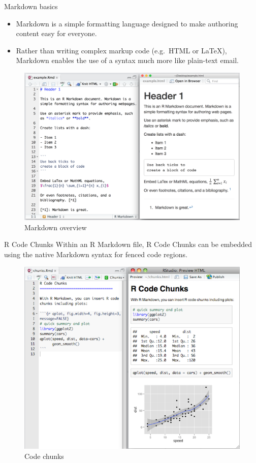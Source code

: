 \documentclass[
  ignorenonframetext,
]{beamer}
\begin{document}
\begin{frame}{Markdown basics}
\protect\hypertarget{markdown-basics}{}
\begin{itemize}
\item
  Markdown is a simple formatting language designed to make authoring
  content easy for everyone.
\item
  Rather than writing complex markup code (e.g.~HTML or LaTeX), Markdown
  enables the use of a syntax much more like plain-text email.
\end{itemize}

\begin{figure}
\centering
\includegraphics{markdown.png}
\caption{Markdown overview}
\end{figure}
\end{frame}

\begin{frame}{R Code Chunks}
\protect\hypertarget{r-code-chunks}{}
Within an R Markdown file, R Code Chunks can be embedded using the
native Markdown syntax for fenced code regions.

\begin{figure}
\centering
\includegraphics{codechunk.png}
\caption{Code chunks}
\end{figure}
\end{frame}
\end{document}
